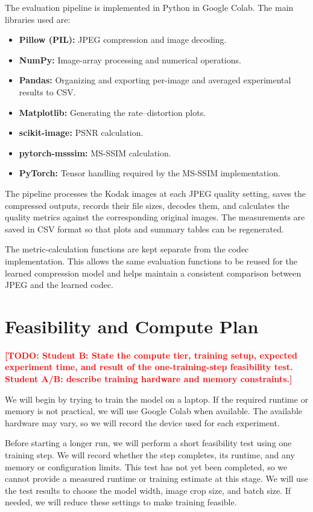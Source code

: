\documentclass[11pt]{article}
\newcommand{\todo}[1]{\textcolor{red}{\textbf{[TODO: #1]}}}
\begin{document}
The evaluation pipeline is implemented in Python in Google Colab.
The main libraries used are:
\begin{itemize}[leftmargin=*]
    \item \textbf{Pillow (PIL):} JPEG compression and image decoding.
    \item \textbf{NumPy:} Image-array processing and numerical operations.
    \item \textbf{Pandas:} Organizing and exporting per-image and
    averaged experimental results to CSV.
    \item \textbf{Matplotlib:} Generating the rate--distortion plots.
    \item \textbf{scikit-image:} PSNR calculation.
    \item \textbf{pytorch-msssim:} MS-SSIM calculation.
    \item \textbf{PyTorch:} Tensor handling required by the MS-SSIM
    implementation.
\end{itemize}

The pipeline processes the Kodak images at each JPEG quality setting,
saves the compressed outputs, records their file sizes, decodes them,
and calculates the quality metrics against the corresponding original
images. The measurements are saved in CSV format so that plots and
summary tables can be regenerated.

The metric-calculation functions are kept separate from the codec
implementation. This allows the same evaluation functions to be reused
for the learned compression model and helps maintain a consistent
comparison between JPEG and the learned codec.

\section{Feasibility and Compute Plan}
\todo{Student B: State the compute tier, training setup, expected
experiment time, and result of the one-training-step feasibility test.
Student A/B: describe training hardware and memory constraints.}

We will begin by trying to train the model on a laptop. If the required
runtime or memory is not practical, we will use Google Colab when
available. The available hardware may vary, so we will record the
device used for each experiment.

Before starting a longer run, we will perform a short feasibility test
using one training step. We will record whether the step completes,
its runtime, and any memory or configuration limits. This test has not
yet been completed, so we cannot provide a measured runtime or training
estimate at this stage. We will use the test results to choose the
model width, image crop size, and batch size. If needed, we will reduce
these settings to make training feasible.
\end{document}
